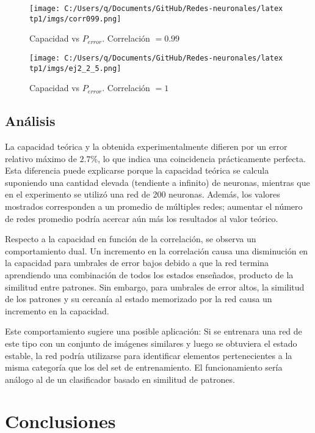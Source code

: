 \documentclass[11pt]{article} %
\begin{document}
\begin{figure}[h!]
    \centering
    \texttt{[image: C:/Users/q/Documents/GitHub/Redes-neuronales/latex tp1/imgs/corr099.png]}
    \caption{Capacidad vs $P_{error}$. Correlación $= 0.99$}
    \label{img-0.99}
\end{figure}


\begin{figure}[h!]
    \centering
    \texttt{[image: C:/Users/q/Documents/GitHub/Redes-neuronales/latex tp1/imgs/ej2\_2\_5.png]}
    \caption{Capacidad vs $P_{error}$. Correlación $= 1$}
    \label{fig:ej2_2_5}
\end{figure}

\clearpage
\newpage

\subsection{Análisis}

La capacidad teórica y la obtenida experimentalmente difieren por un error relativo máximo de $2.7 \%$, lo que indica una coincidencia prácticamente perfecta. Esta diferencia puede explicarse porque la capacidad teórica se calcula suponiendo una cantidad elevada (tendiente a infinito) de neuronas, mientras que en el experimento se utilizó una red de 200 neuronas. Además, los valores mostrados corresponden a un promedio de múltiples redes; aumentar el número de redes promedio podría acercar aún más los resultados al valor teórico.

Respecto a la capacidad en función de la correlación, se observa un comportamiento dual. Un incremento en la correlación causa una disminución en la capacidad para umbrales de error bajos debido a que la red termina aprendiendo una combinación de todos los estados enseñados, producto de la similitud entre patrones. Sin embargo, para umbrales de error altos, la similitud de los patrones y su cercanía al estado memorizado por la red causa un incremento en la capacidad. 

Este comportamiento sugiere una posible aplicación: Si se entrenara una red de este tipo con un conjunto de imágenes similares y luego se obtuviera el estado estable, la red podría utilizarse para identificar elementos pertenecientes a la misma categoría que los del set de entrenamiento. El funcionamiento sería análogo al de un clasificador basado en similitud de patrones.

\section{Conclusiones}
\end{document}
